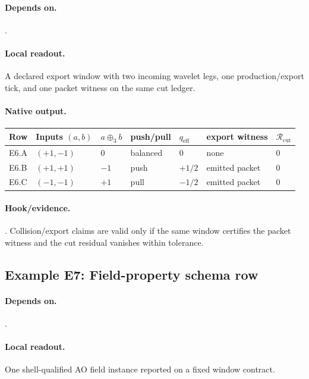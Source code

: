 \paragraph{Depends on.} .
\paragraph{Local readout.} A declared export window with two incoming wavelet legs, one production/export tick, and one packet witness on the same cut ledger.
\paragraph{Native output.}
{\footnotesize
\begin{center}
\begin{tabular}{@{}lllllll@{}}
\toprule
Row & Inputs $(a,b)$ & $a\oplus_3 b$ & push/pull & $q_{\mathrm{eff}}$ & export witness & $\mathcal R_{\mathrm{cut}}$ \\
\midrule
E6.A & $(+1,-1)$ & $0$ & balanced & $0$ & none & $0$ \\
E6.B & $(+1,+1)$ & $-1$ & push & $+1/2$ & emitted packet & $0$ \\
E6.C & $(-1,-1)$ & $+1$ & pull & $-1/2$ & emitted packet & $0$ \\
\bottomrule
\end{tabular}
\end{center}}
\paragraph{Hook/evidence.} . Collision/export claims are valid only if the same window certifies the packet witness and the cut residual vanishes within tolerance.

\subsection{Example E7: Field-property schema row}\label{ex:e7}
\paragraph{Depends on.} .
\paragraph{Local readout.} One shell-qualified AO field instance reported on a fixed window contract.
